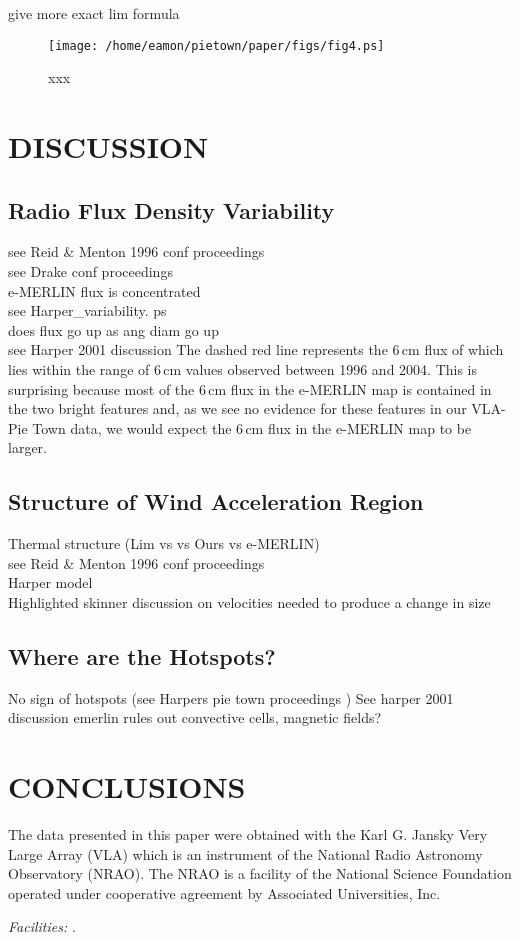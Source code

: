 \documentclass[iop]{emulateapj}
\begin{document}
give more exact lim formula 

\begin{figure}
\texttt{[image: /home/eamon/pietown/paper/figs/fig4.ps]}
\caption{xxx }
\label{fig3}
\end{figure}

\section{DISCUSSION}
\subsection{Radio Flux Density Variability} 
see Reid \& Menton 1996 conf proceedings\\
see Drake conf proceedings\\
e-MERLIN flux is concentrated\\
see Harper\_variability. ps\\
does flux go up as ang diam go up\\
see Harper 2001 discussion
The dashed red line represents the 6\,cm flux of \cite{richards_2013} which lies within the range of 6\,cm values observed between 1996 and 2004. This is surprising because most of the 6\,cm flux in the e-MERLIN map is contained in the two bright features and, as we see no evidence for these features in our VLA-Pie Town data, we would expect the 6\,cm flux in the e-MERLIN map to be larger.

\subsection{Structure of Wind Acceleration Region} 
Thermal structure (Lim vs vs Ours vs e-MERLIN)\\
see Reid \& Menton 1996 conf proceedings\\
Harper model\\
Highlighted skinner discussion on velocities needed to produce a change in size

\subsection{Where are the Hotspots?}

No sign of hotspots (see Harpers pie town proceedings )
See harper 2001 discussion	
emerlin rules out convective cells, magnetic fields?





\section{CONCLUSIONS}
 


\acknowledgments
The data presented in this paper were obtained with the Karl G. Jansky Very Large Array (VLA) which is an instrument of the National Radio Astronomy Observatory (NRAO). The NRAO is a facility of the National Science Foundation operated under cooperative agreement by Associated Universities, Inc. 

{\it Facilities:} .




\end{document}
